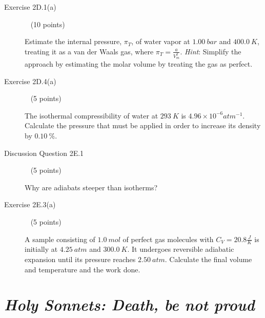 \documentclass[12pt, openany, letterpaper]{memoir}
\begin{document}
\begin{description}
	      \vspace{20em}
	\item [Exercise 2D.1(a)] ~ (10 points)

	      Estimate the internal pressure, $\pi_T$, of water vapor at $1.00~bar$ and $400.0~K$, treating it as a van der Waals gas, where $\pi_T=\frac{a}{V_m^2}$. \emph{Hint}: Simplify the approach by estimating the molar volume by treating the gas as perfect.

	      \vspace{20em}
	\item [Exercise 2D.4(a)] ~ (5 points)

	      The isothermal compressibility of water at $293~K$ is $4.96\times10^{-6}atm^{-1}$. Calculate the pressure that must be applied in order to increase its density by $0.10~\%$.

	      \vspace{12em}
	\item [Discussion Question 2E.1] ~ (5 points)

	      Why are adiabats steeper than isotherms?

	      \vspace{10em}
	\item [Exercise 2E.3(a)] ~ (5 points)

	      A sample consisting of $1.0~mol$ of perfect gas molecules with $C_V=20.8\frac{J}{K}$ is initially at $4.25~atm$ and $300.0~K$. It undergoes reversible adiabatic expansion until its pressure reaches $2.50~atm$. Calculate the final volume and temperature and the work done.
\end{description}

\newpage
\pagestyle{empty}
\addtocounter{page}{-1}
\section*{\emph{Holy Sonnets: Death, be not proud}}
\end{document}
